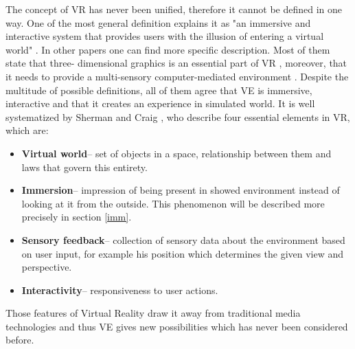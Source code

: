 	The concept of VR has never been unified, therefore it cannot be defined in one way. One of the most general definition explains it as "an immersive and interactive system that provides users with the illusion of entering a virtual world" \cite{Heim98}. In other papers one can find more specific description. Most of them state that three- dimensional graphics is an essential part of VR \cite{Fuchs92}, moreover, that it needs to provide a multi-sensory computer-mediated environment \cite{Cruz93}. Despite the multitude of possible definitions, all of them agree that VE is immersive, interactive and that it creates an experience in simulated world. It is well systematized by Sherman and Craig \cite{Sherman03}, who describe four essential elements in VR, which are:
\begin{itemize}
\item \textbf{Virtual world}– set of objects in a space, relationship between them and laws that govern this entirety.
\item \textbf{Immersion}– impression of being present in showed environment instead of looking at it from the outside. This phenomenon will be described more precisely in section \ref{imm}.
\item \textbf{Sensory feedback}– collection of sensory data about the environment based on user input, for example his position which determines the given view and perspective.
\item \textbf{Interactivity}– responsiveness to user actions.
\end{itemize}
Those features of Virtual Reality draw it away from traditional media technologies and thus VE gives new possibilities which has never been considered before.
	
